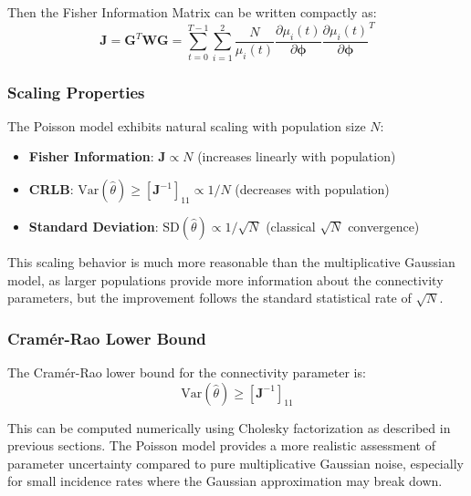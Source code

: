 Then the Fisher Information Matrix can be written compactly as:
\begin{equation}
\mathbf{J} = \mathbf{G}^T \mathbf{W} \mathbf{G} = \sum_{t=0}^{T-1}\sum_{i=1}^{2} \frac{N}{\mu_i(t)} \frac{\partial \mu_i(t)}{\partial \boldsymbol{\phi}} \frac{\partial \mu_i(t)}{\partial \boldsymbol{\phi}}^T
\end{equation}

\subsubsection{Scaling Properties}

The Poisson model exhibits natural scaling with population size $N$:

\begin{itemize}
\item \textbf{Fisher Information}: $\mathbf{J} \propto N$ (increases linearly with population)
\item \textbf{CRLB}: $\text{Var}(\hat{\theta}) \geq [\mathbf{J}^{-1}]_{11} \propto 1/N$ (decreases with population)
\item \textbf{Standard Deviation}: $\text{SD}(\hat{\theta}) \propto 1/\sqrt{N}$ (classical $\sqrt{N}$ convergence)
\end{itemize}

This scaling behavior is much more reasonable than the multiplicative Gaussian model, as larger populations provide more information about the connectivity parameters, but the improvement follows the standard statistical rate of $\sqrt{N}$.

\subsubsection{Cramér-Rao Lower Bound}

The Cramér-Rao lower bound for the connectivity parameter is:
\begin{equation}
\text{Var}(\hat{\theta}) \geq [\mathbf{J}^{-1}]_{11}
\end{equation}

This can be computed numerically using Cholesky factorization as described in previous sections. The Poisson model provides a more realistic assessment of parameter uncertainty compared to pure multiplicative Gaussian noise, especially for small incidence rates where the Gaussian approximation may break down.
